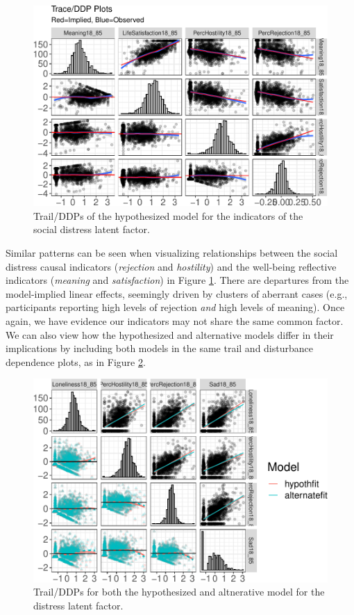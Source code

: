 \documentclass[
  english,
  man]{apa6}
\begin{document}
\begin{figure}

{\centering \includegraphics[width=0.9\linewidth]{flexplavaan_draft_files/figure-latex/trailreal2-1} 

}

\caption{Trail/DDPs of the hypothesized model for the indicators of the social distress latent factor.}\label{fig:trailreal2}
\end{figure}

Similar patterns can be seen when visualizing relationships between the social distress causal indicators (\emph{rejection} and \emph{hostility}) and the well-being reflective indicators (\emph{meaning} and \emph{satisfaction}) in Figure \ref{fig:trailreal2}. There are departures from the model-implied linear effects, seemingly driven by clusters of aberrant cases (e.g., participants reporting high levels of rejection \emph{and} high levels of meaning). Once again, we have evidence our indicators may not share the same common factor. We can also view how the hypothesized and alternative models differ in their implications by including both models in the same trail and disturbance dependence plots, as in Figure \ref{fig:tralboth}.

\begin{figure}
\centering
\includegraphics{flexplavaan_draft_files/figure-latex/tralboth-1.pdf}
\caption{\label{fig:tralboth}Trail/DDPs for both the hypothesized and altnerative model for the distress latent factor.}
\end{figure}
\end{document}
